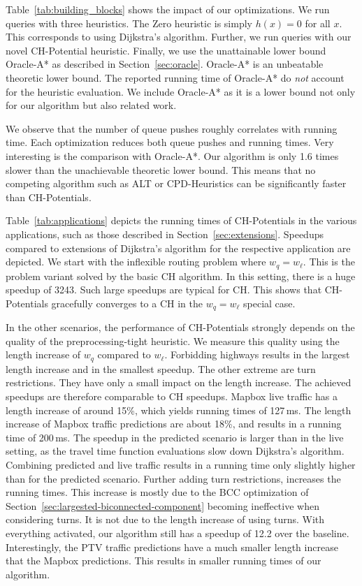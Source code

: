 \documentclass[a4paper,USenglish,cleveref, autoref, thm-restate]{lipics-v2019}
\begin{document}
Table~\ref{tab:building_blocks} shows the impact of our optimizations.
We run queries with three heuristics.
The Zero heuristic is simply $h(x)=0$ for all $x$.
This corresponds to using Dijkstra's algorithm.
Further, we run queries with our novel CH-Potential heuristic.
Finally, we use the unattainable lower bound Oracle-A* as described in Section~\ref{sec:oracle}.
Oracle-A* is an unbeatable theoretic lower bound.
The reported running time of Oracle-A* do \emph{not} account for the heuristic evaluation.
We include Oracle-A* as it is a lower bound not only for our algorithm but also related work.

We observe that the number of queue pushes roughly correlates with running time.
Each optimization reduces both queue pushes and running times.
Very interesting is the comparison with Oracle-A*.
Our algorithm is only 1.6 times slower than the unachievable theoretic lower bound.
This means that no competing algorithm such as ALT or CPD-Heuristics can be significantly faster than CH-Potentials.

Table~\ref{tab:applications} depicts the running times of CH-Potentials in the various applications, such as those described in Section~\ref{sec:extensions}.
Speedups compared to extensions of Dijkstra's algorithm for the respective application are depicted.
We start with the inflexible routing problem where $w_q = w_\ell$.
This is the problem variant solved by the basic CH algorithm.
In this setting, there is a huge speedup of 3243.
Such large speedups are typical for CH.
This shows that CH-Potentials gracefully converges to a CH in the $w_q = w_\ell$ special case.

In the other scenarios, the performance of CH-Potentials strongly depends on the quality of the preprocessing-tight heuristic.
We measure this quality using the length increase of $w_q$ compared to $w_\ell$.
Forbidding highways results in the largest length increase and in the smallest speedup.
The other extreme are turn restrictions.
They have only a small impact on the length increase.
The achieved speedups are therefore comparable to CH speedups.
%
Mapbox live traffic has a length increase of around 15\%, which yields running times of 127\,ms.
The length increase of Mapbox traffic predictions are about 18\%, and results in a running time of 200\,ms.
The speedup in the predicted scenario is larger than in the live setting, as the travel time function evaluations slow down Dijkstra's algorithm.
Combining predicted and live traffic results in a running time only slightly higher than for the predicted scenario.
Further adding turn restrictions, increases the running times.
This increase is mostly due to the BCC optimization of Section~\ref{sec:largested-biconnected-component} becoming ineffective when considering turns.
It is not due to the length increase of using turns.
With everything activated, our algorithm still has a speedup of 12.2 over the baseline.
Interestingly, the PTV traffic predictions have a much smaller length increase that the Mapbox predictions.
This results in smaller running times of our algorithm.
\end{document}
